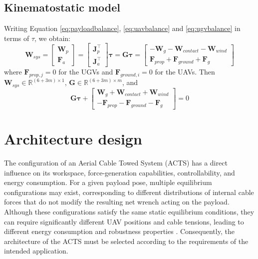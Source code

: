 \subsection{Kinematostatic model}
Writing Equation \eqref{eq:payloadbalance}, \eqref{eq:uavbalance} and \eqref{eq:ugvbalance} in terms of $\tau$, we obtain:
\begin{equation}
    \mathbf{W}_{sys} = \begin{bmatrix}
        \mathbf{W}_p \\ \mathbf{F}_a
    \end{bmatrix} = 
    \begin{bmatrix}
        \mathbf{J}_p^\top \\ \mathbf{J}_a^\top
    \end{bmatrix} \boldsymbol{\tau} = \mathbf{G}\boldsymbol{\tau} = \begin{bmatrix}
        -\mathbf{W}_g - \mathbf{W}_{contact} - \mathbf{W}_{wind} \\
        \mathbf{F}_{prop} + \mathbf{F}_{ground} + \mathbf{F}_g
    \end{bmatrix}
\end{equation}
where $\mathbf{F}_{prop,j} = 0$ for the UGVs and $\mathbf{F}_{ground, i} = 0$ for the UAVs. Then $\mathbf{W}_{sys} \in \mathbb{R}^{(6+3m)\times 1}$, $\mathbf{G} \in \mathbb{R}^{(6+3m)\times m}$, and
\begin{equation}
    \mathbf{G}\boldsymbol{\tau} + \begin{bmatrix}
        \boldsymbol{W}_g + \boldsymbol{W}_{contact} + \boldsymbol{W}_{wind} \\
        - \boldsymbol{F}_{prop} - \boldsymbol{F}_{ground} - \boldsymbol{F}_g
    \end{bmatrix} = 0
\end{equation}



\section{Architecture design}
\label{sec:architecture_design}

The configuration of an Aerial Cable Towed System (ACTS) has a direct influence on its workspace, force-generation capabilities, controllability, and energy consumption. For a given payload pose, multiple equilibrium configurations may exist, corresponding to different distributions of internal cable forces that do not modify the resulting net wrench acting on the payload. Although these configurations satisfy the same static equilibrium conditions, they can require significantly different UAV positions and cable tensions, leading to different energy consumption and robustness properties \cite{tognon_aerial_2018}.
Consequently, the architecture of the ACTS must be selected according to the requirements of the intended application. 

